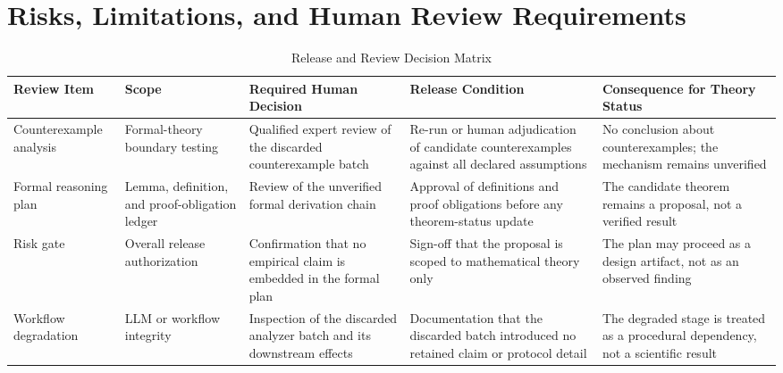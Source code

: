 \documentclass[conference]{IEEEtran}
\begin{document}
\section{Risks, Limitations, and Human Review Requirements}
\begin{table}[htbp]
\centering
\footnotesize
\setlength{\tabcolsep}{3pt}
\renewcommand{\arraystretch}{1.12}
\caption{Release and Review Decision Matrix}
\label{tab:risk-limitations-and-review-risk-limitations-and-review-1}
\begin{tabular}{|p{}|p{}|p{}|p{}|p{}|}
\hline
Review Item & Scope & Required Human Decision & Release Condition & Consequence for Theory Status \\\hline
Counterexample analysis & Formal-theory boundary testing & Qualified expert review of the discarded counterexample batch & Re-run or human adjudication of candidate counterexamples against all declared assumptions & No conclusion about counterexamples; the mechanism remains unverified \\\hline
Formal reasoning plan & Lemma, definition, and proof-obligation ledger & Review of the unverified formal derivation chain & Approval of definitions and proof obligations before any theorem-status update & The candidate theorem remains a proposal, not a verified result \\\hline
Risk gate & Overall release authorization & Confirmation that no empirical claim is embedded in the formal plan & Sign-off that the proposal is scoped to mathematical theory only & The plan may proceed as a design artifact, not as an observed finding \\\hline
Workflow degradation & LLM or workflow integrity & Inspection of the discarded analyzer batch and its downstream effects & Documentation that the discarded batch introduced no retained claim or protocol detail & The degraded stage is treated as a procedural dependency, not a scientific result \\\hline
\end{tabular}
\end{table}
\end{document}
